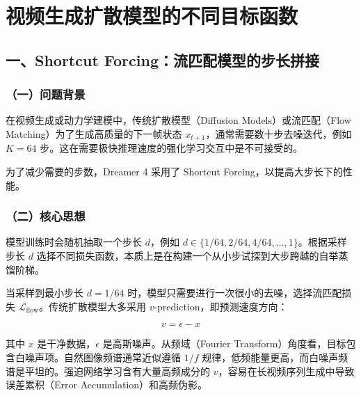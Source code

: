 \setcounter{section}{5}

\hypertarget{ux89c6ux9891ux751fux6210ux6269ux6563ux6a21ux578bux7684ux4e0dux540cux76eeux6807ux51fdux6570}{%
\section{视频生成扩散模型的不同目标函数}\label{ux89c6ux9891ux751fux6210ux6269ux6563ux6a21ux578bux7684ux4e0dux540cux76eeux6807ux51fdux6570}}

\hypertarget{ux4e00shortcut-forcingux6d41ux5339ux914dux6a21ux578bux7684ux6b65ux957fux62fcux63a5}{%
\subsection{一、Shortcut Forcing：流匹配模型的步长拼接}\label{ux4e00shortcut-forcingux6d41ux5339ux914dux6a21ux578bux7684ux6b65ux957fux62fcux63a5}}

\hypertarget{ux4e00ux95eeux9898ux80ccux666f-3}{%
\subsubsection{（一）问题背景}\label{ux4e00ux95eeux9898ux80ccux666f-3}}

在视频生成或动力学建模中，传统扩散模型（Diffusion Models）或流匹配（Flow Matching）为了生成高质量的下一帧状态 \(x_{t+1}\)，通常需要数十步去噪迭代，例如 \(K=64\) 步。这在需要极快推理速度的强化学习交互中是不可接受的。

为了减少需要的步数，Dreamer 4 采用了 Shortcut Forcing，以提高大步长下的性能。

\hypertarget{ux4e8cux6838ux5fc3ux601dux60f3-4}{%
\subsubsection{（二）核心思想}\label{ux4e8cux6838ux5fc3ux601dux60f3-4}}

模型训练时会随机抽取一个步长 \(d\)，例如 \(d\in\{1/64,2/64,4/64,\ldots,1\}\)。根据采样步长 \(d\) 选择不同损失函数，本质上是在构建一个从小步试探到大步跨越的自举蒸馏阶梯。

当采样到最小步长 \(d=1/64\) 时，模型只需要进行一次很小的去噪，选择流匹配损失 \(\mathcal{L}_{\mathrm{flow}}\)。传统扩散模型大多采用 \(v\)-prediction，即预测速度方向：

\[
v=\epsilon-x
\]

其中 \(x\) 是干净数据，\(\epsilon\) 是高斯噪声。从频域（Fourier Transform）角度看，目标包含白噪声项。自然图像频谱通常近似遵循 \(1/f\) 规律，低频能量更高，而白噪声频谱是平坦的。强迫网络学习含有大量高频成分的 \(v\)，容易在长视频序列生成中导致误差累积（Error Accumulation）和高频伪影。

